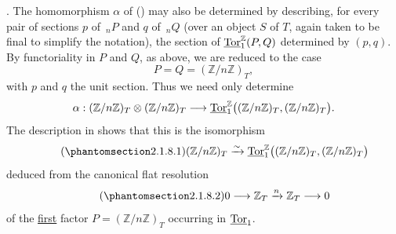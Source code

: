 . The homomorphism $\alpha$ of () may also be determined by
describing, for every pair of sections $p$ of $\,{}_nP$ and $q$ of
$\,{}_nQ$ (over an object $S$ of $T$, again taken to be final to
simplify the notation), the section of
$\uTor^{\mathbb Z}_1(P,Q)$ determined by $(p,q)$.  By functoriality in
$P$ and $Q$, as above, we are reduced to the case
\[
 P=Q=(\mathbb Z/n\mathbb Z)_T,
\]
with $p$ and $q$ the unit section.  Thus we need only determine
\[
 \alpha:
 (\mathbb Z/n\mathbb Z)_T\otimes(\mathbb Z/n\mathbb Z)_T
 \longrightarrow
 \uTor^{\mathbb Z}_1
 \bigl((\mathbb Z/n\mathbb Z)_T,(\mathbb Z/n\mathbb Z)_T\bigr).
\]
The description in  shows that this is the isomorphism
\begin{equation}\tag{\SGARefTarget{sga7.sga7i.eviii.n2-1-8-1}{2.1.8.1}}
 (\mathbb Z/n\mathbb Z)_T
 \xrightarrow{\sim}
 \uTor^{\mathbb Z}_1
 \bigl((\mathbb Z/n\mathbb Z)_T,(\mathbb Z/n\mathbb Z)_T\bigr)
\end{equation}
deduced from the canonical flat resolution
\begin{equation}\tag{\SGARefTarget{sga7.sga7i.eviii.n2-1-8-2}{2.1.8.2}}
 0\longrightarrow\mathbb Z_T
 \xrightarrow{n}\mathbb Z_T
 \longrightarrow0
\end{equation}
of the \underline{first} factor
$P=(\mathbb Z/n\mathbb Z)_T$ occurring in $\uTor_1$.
